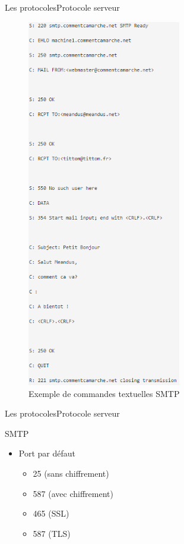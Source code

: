 \documentclass{beamer}
\begin{document}
\begin{frame}{Les protocoles}{Protocole serveur}
\begin{example}
    \begin{figure}[H]
    \centering
    \includegraphics[width=0.6\textwidth]{message_smtp}
     \caption{Exemple de commandes textuelles SMTP}
     \label{fig:commande_text_SMTP}
    \end{figure}
\end{example}
\end{frame}


\begin{frame}{Les protocoles}{Protocole serveur}
  \begin{block}{SMTP}
  \begin{itemize}
    \item<1->{
    Port par défaut \\
    \begin{itemize}
        \item 25 (sans chiffrement) 
        \item 587 (avec chiffrement)
        \item 465 (SSL)
        \item 587 (TLS)
    \end{itemize}
    }
  \end{itemize}
  \end{block}
\end{frame}
\end{document}
